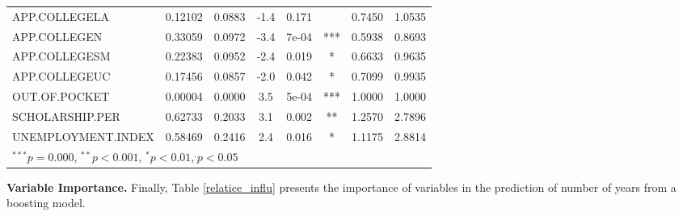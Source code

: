 \documentclass[12pt,english]{report}
\begin{document}
\begin{table}[H]
\begin{adjustbox}{width=0.95\textwidth}
\begin{tabular}{|lccccccc|}
APP.COLLEGELA                  &  0.12102 & 0.0883 &  -1.4  &  0.171 &    &0.7450 & 1.0535 \\
APP.COLLEGEN                   &  0.33059 & 0.0972 &  -3.4  &  7e-04 & ***&0.5938 & 0.8693 \\
APP.COLLEGESM                  &  0.22383 & 0.0952 &  -2.4  &  0.019 & *  &0.6633 & 0.9635 \\
APP.COLLEGEUC                  &  0.17456 & 0.0857 &  -2.0  &  0.042 & *  &0.7099 & 0.9935 \\
OUT.OF.POCKET                  &  0.00004 & 0.0000 &   3.5  &  5e-04 & ***&1.0000 & 1.0000 \\
SCHOLARSHIP.PER                &  0.62733 & 0.2033 &   3.1  &  0.002 & ** &1.2570 & 2.7896 \\
UNEMPLOYMENT.INDEX             &  0.58469 & 0.2416 &   2.4  &  0.016 & *  &1.1175 & 2.8814 \\
\hline %
\multicolumn{7}{l}{\scriptsize{$^{***} p=0.000$, $^{**} p<0.001$, $^*p<0.01$,$^{.}p<0.05$}}

\end{tabular}
\end{adjustbox}
\end{table}
 

 
 
 
 
 
 
 
 
 
 
 
 
 
 
 
 
 
 
 
 
 
 





\vspace{0.15in}
\noindent \textbf{Variable Importance.} Finally, Table \ref{relatice_influ} presents the importance of variables in the prediction of number of years from a boosting model. %
\end{document}
